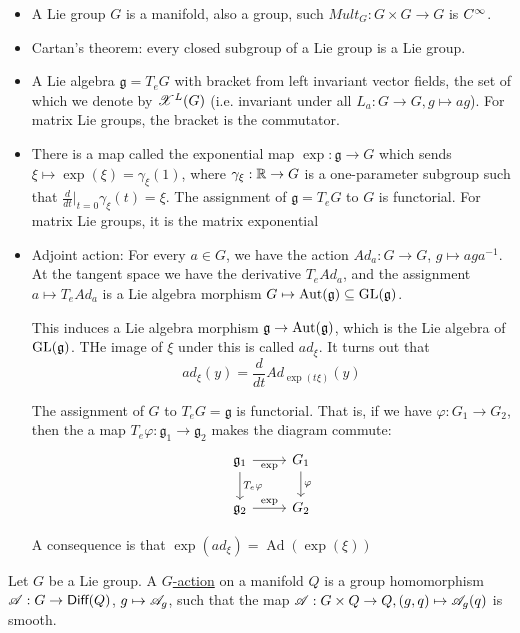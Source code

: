 \documentclass[x11names,reqno,14pt]{extarticle}
\newcommand{\mk}[1]{\mathfrak{#1}}
\newcommand{\g}{\mk{g}}
\DeclareMathOperator{\Ad}{Ad}
\newcommand{\dd}[2]{\frac{d#1}{d#2}}
\begin{document}
\begin{itemize}

\item A Lie group $G$ is a manifold, also a group, such $Mult_G:G\times G \to G$ is $C^\infty$. 

\item Cartan's theorem: every closed subgroup of a Lie group is a Lie group. 

\item A Lie algebra $\g = T_eG$ with bracket from left invariant vector fields, the set of which we denote by $\mathscr{X}^L(G)$ (i.e. invariant under all $L_a:G\to G, g \mapsto ag$). For matrix Lie groups, the bracket is the commutator.

\item There is a map called the exponential map $\exp:\g\to G$ which sends $\xi \mapsto \exp(\xi) = \gamma_\xi(1)$, where $\gamma_\xi:\mathbb{R}\to G$ is a one-parameter subgroup such that $\dd{}{t}|_{t=0}\gamma_\xi(t) = \xi$. The assignment of $\g = T_eG$ to $G$ is functorial. For matrix Lie groups, it is the matrix exponential

\item Adjoint action: For every $a \in G$, we have the action $Ad_a:G\to G$, $g\mapsto aga^{-1}$. At the tangent space we have the derivative $T_eAd_a$, and the assignment $a \mapsto T_eAd_a$ is a Lie algebra morphism $G \mapsto \Aut(\g) \subseteq \GL(\g)$. 

This induces a Lie algebra morphism $\g \to \Aut(\g)$, which is the Lie algebra of $\GL(\g)$. THe image of $\xi$ under this is called $ad_\xi$. It turns out that
\[
ad_\xi(y)=\dd{}{t}Ad_{\exp(t\xi)}(y)
\]

The assignment of $G$ to $T_eG=\g$ is functorial. That is, if we have $\varphi:G_1\to G_2$, then the a map $T_e\varphi:\g_1\to\g_2$ makes the diagram commute:
\[
\begin{tikzcd}
\g_1 \ar[r, "\exp"']\ar[d, "T_e\varphi"] & G_1 \ar[d, "\varphi"]\\
\g_2 \ar[r, "\exp"] & G_2
\end{tikzcd}
\]

A consequence is that $\exp(ad_\xi) = \Ad(\exp(\xi))$

\end{itemize}



Let $G$ be a Lie group. A \underline{$G$-action} on a manifold $Q$ is a group homomorphism $\mathscr{A}:G\to{{\text{\sffamily {Diff}}}}(Q)$, $g\mapsto \mathscr{A}_g$, such that the map $\mathscr{A}:G\times Q \to Q, (g,q) \mapsto \mathscr{A}_g(q)$ is smooth. 
\end{document}
